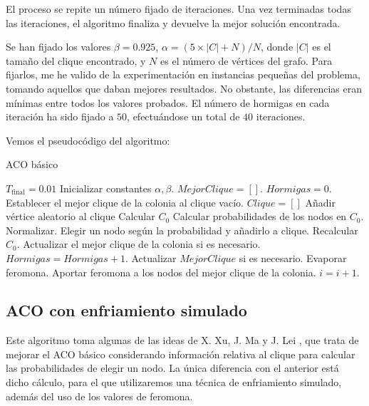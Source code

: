 El proceso se repite un número fijado de iteraciones. Una vez terminadas todas las
iteraciones, el algoritmo finaliza y devuelve la mejor solución encontrada.

Se han fijado los valores $\beta = 0.925$, $\alpha = (5 \times |C| + N) / N$, donde
$|C|$ es el tamaño del clique encontrado, y $N$ es el número de vértices del grafo.
Para fijarlos, me he valido de la experimentación en instancias pequeñas del problema,
tomando aquellos que daban mejores resultados. No obstante, las diferencias eran
mínimas entre todos los valores probados. El número de hormigas en cada iteración
ha sido fijado a $50$, efectuándose un total de $40$ iteraciones.

Vemos el pseudocódigo del algoritmo:

\begin{algorithm}[H]
\caption{ACO básico}
  \begin{algorithmic}
    \State $T_{\text{final}} = 0.01$
    \State Inicializar constantes $\alpha, \beta$.
    \State $Mejor Clique = []$.
    \Repeat
      \State $Hormigas = 0$.
      \State Establecer el mejor clique de la colonia al clique vacío.
      \Repeat
        \State $Clique = []$
        \State Añadir vértice aleatorio al clique
        \State Calcular $C_0$
        \Repeat
          \State Calcular probabilidades de los nodos en $C_0$. Normalizar.
          \State Elegir un nodo según la probabilidad y añadirlo a clique.
          \State Recalcular $C_0$.
        \State Actualizar el mejor clique de la colonia si es necesario.
        \State $Hormigas = Hormigas + 1$.
      \State Actualizar $Mejor Clique$ si es necesario.
      \State Evaporar feromona.
      \State Aportar feromona a los nodos del mejor clique de la colonia.
      \State $i = i+1$.
  \EndFunction
  \end{algorithmic}
\end{algorithm}


\subsection{ACO con enfriamiento simulado}\label{aco-sa}

Este algoritmo toma algunas de las ideas de X. Xu, J. Ma y J. Lei \citep{xu:2007},
que trata de mejorar el ACO básico considerando información relativa al clique
para calcular las probabilidades de elegir un nodo. La única diferencia con el
anterior está dicho cálculo, para el que utilizaremos una técnica de enfriamiento
simulado, además del uso de los valores de feromona.

